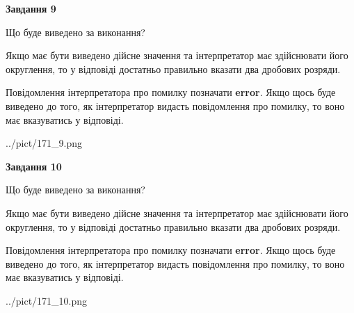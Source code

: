 \documentclass[12pt, ukrainian]{article}
\begin{document}
{\begin {Large}
{\begin {center}\textbf{Завдання 9}\end {center}}\par
Що буде виведено за виконання? \par

Якщо має бути виведено дійсне значення та інтерпретатор має здійснювати його округлення, 
то у відповіді достатньо правильно вказати два дробових розряди.

Повідомлення інтерпретатора про помилку позначати \textbf{error}.
Якщо щось буде виведено до того, як інтерпретатор видасть повідомлення про помилку, 
то воно має вказуватись у відповіді. \par

\begin{center}
	{../pict/171_9.png}
\end{center}
\newpage

{\begin {center}\textbf{Завдання 10}\end {center}}\par
Що буде виведено за виконання? \par

Якщо має бути виведено дійсне значення та інтерпретатор має здійснювати його округлення, 
то у відповіді достатньо правильно вказати два дробових розряди.

Повідомлення інтерпретатора про помилку позначати \textbf{error}.
Якщо щось буде виведено до того, як інтерпретатор видасть повідомлення про помилку, 
то воно має вказуватись у відповіді. \par

\begin{center}
	{../pict/171_10.png}
\end{center}
\newpage

\end {Large}}
\end{document}
